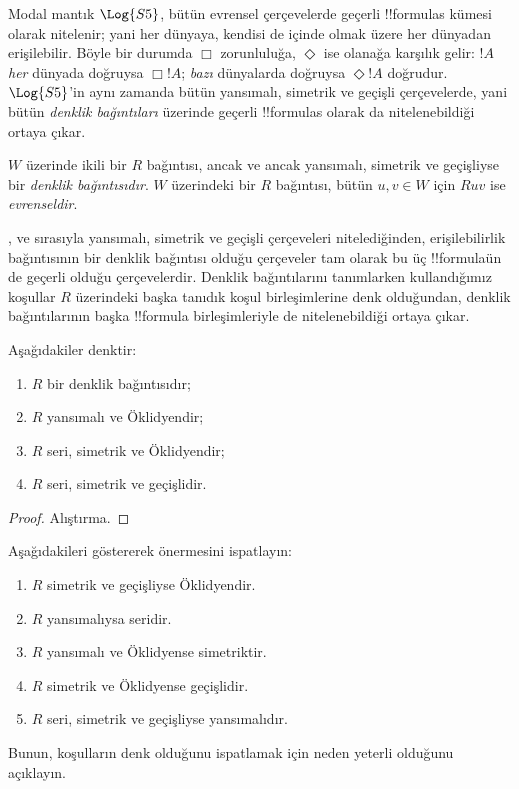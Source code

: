 



Modal mantık $\Log{S5}$, bütün evrensel çerçevelerde geçerli !!{formula}s
kümesi olarak nitelenir; yani her dünyaya, kendisi de içinde olmak üzere her
dünyadan erişilebilir. Böyle bir durumda $\Box$ zorunluluğa, $\Diamond$ ise
olanağa karşılık gelir: $!A$ \emph{her} dünyada doğruysa $\Box !A$;
\emph{bazı} dünyalarda doğruysa $\Diamond !A$ doğrudur. $\Log{S5}$'in
aynı zamanda bütün yansımalı, simetrik ve geçişli çerçevelerde, yani bütün
\emph{denklik bağıntıları} üzerinde geçerli !!{formula}s olarak da
nitelenebildiği ortaya çıkar.

\begin{defn}
  $W$ üzerinde ikili bir $R$ bağıntısı, ancak ve ancak yansımalı, simetrik ve
  geçişliyse bir \emph{denklik bağıntısıdır}. $W$ üzerindeki bir $R$
  bağıntısı, bütün $u,v\in W$ için $Ruv$ ise \emph{evrenseldir}.
\end{defn}

,  ve  sırasıyla yansımalı, simetrik ve geçişli
çerçeveleri nitelediğinden, erişilebilirlik bağıntısının bir denklik
bağıntısı olduğu çerçeveler tam olarak bu üç !!{formula}{}ün de geçerli
olduğu çerçevelerdir. Denklik bağıntılarını tanımlarken kullandığımız
koşullar $R$ üzerindeki başka tanıdık koşul birleşimlerine denk olduğundan,
denklik bağıntılarının başka !!{formula} birleşimleriyle de nitelenebildiği
ortaya çıkar.

\begin{prop}
  Aşağıdakiler denktir:
  \begin{enumerate}
  \item $R$ bir denklik bağıntısıdır;
  \item $R$ yansımalı ve Öklidyendir;
  \item $R$ seri, simetrik ve Öklidyendir;
  \item $R$ seri, simetrik ve geçişlidir.
  \end{enumerate}
\end{prop}

\begin{proof}
  Alıştırma.
\end{proof}

\begin{prob}
  Aşağıdakileri göstererek 
  önermesini ispatlayın:
  \begin{enumerate}
  \item $R$ simetrik ve geçişliyse Öklidyendir.
  \item $R$ yansımalıysa seridir.
  \item $R$ yansımalı ve Öklidyense simetriktir.
  \item $R$ simetrik ve Öklidyense geçişlidir.
  \item $R$ seri, simetrik ve geçişliyse yansımalıdır.
  \end{enumerate}
  Bunun, koşulların denk olduğunu ispatlamak için neden yeterli olduğunu
  açıklayın.
\end{prob}


